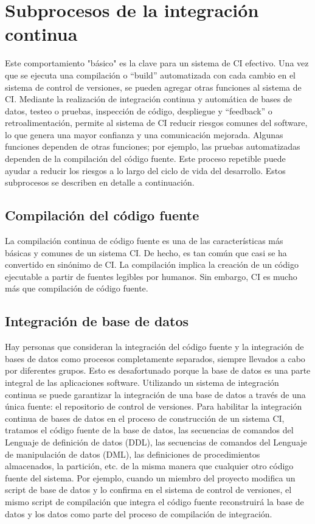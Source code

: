 \section{Subprocesos de la integración continua}
Este comportamiento "básico" es la clave para un sistema de CI efectivo. Una vez que se ejecuta una compilación o “build” automatizada con cada cambio en el sistema de control de versiones, se pueden agregar otras funciones al sistema de CI. Mediante la realización de integración continua y automática de bases de datos, testeo o pruebas, inspección de código, despliegue y  “feedback” o retroalimentación, permite al sistema de CI reducir riesgos comunes del software, lo que genera una mayor confianza y una comunicación mejorada. Algunas funciones dependen de otras funciones; por ejemplo, las pruebas automatizadas dependen de la compilación del código fuente. Este proceso repetible puede ayudar a reducir los riesgos a lo largo del ciclo de vida del desarrollo. Estos subprocesos se describen en detalle a continuación.

\subsection{Compilación del código fuente}
La compilación continua de código fuente es una de las características más básicas y comunes de un sistema CI. De hecho, es tan común que casi se ha convertido en sinónimo de CI. La compilación implica la creación de un código ejecutable a partir de fuentes legibles por humanos. Sin embargo, CI es mucho más que compilación de código fuente.

\subsection{Integración de base de datos}
Hay personas que consideran la integración del código fuente y la integración de bases de datos como procesos completamente separados, siempre llevados a cabo por diferentes grupos. Esto es desafortunado porque la base de datos es una parte integral de las aplicaciones software. Utilizando un sistema de integración continua se puede garantizar la integración de una base de datos a través de una única fuente: el repositorio de control de versiones. Para habilitar la integración continua de bases de datos en el proceso de construcción de un sistema CI, tratamos el código fuente de la base de datos, las secuencias de comandos del Lenguaje de definición de datos (DDL), las secuencias de comandos del Lenguaje de manipulación de datos (DML), las definiciones de procedimientos almacenados, la partición, etc. de la misma manera que cualquier otro código fuente del sistema. Por ejemplo, cuando un miembro del proyecto modifica un script de base de datos y lo confirma en el sistema de control de versiones, el mismo script de compilación que integra el código fuente reconstruirá la base de datos y los datos como parte del proceso de compilación de integración.

